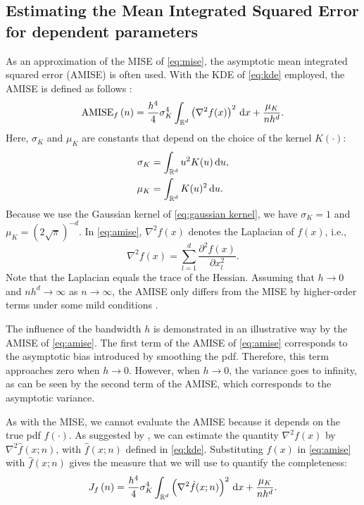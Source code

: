 \subsection{Estimating the Mean Integrated Squared Error for dependent parameters}
\label{sec:mise dependent}

As an approximation of the MISE of \cref{eq:mise}, the asymptotic mean integrated squared error (AMISE) is often used. With the KDE of \cref{eq:kde} employed, the AMISE is defined as follows \cite{marron1992exact}:
\begin{equation}
	\label{eq:amise}
	\textup{AMISE}_{f} \left( n \right) = \frac{h^4}{4} \sigma_K^4 \int_{\mathbb{R}^d} \left( \nabla^2 f(x) \right)^2 \mathrm{\,d} x + \frac{\mu_K}{nh^d}.
\end{equation}
Here, $\sigma_K$ and $\mu_K$ are constants that depend on the choice of the kernel $K(\cdot)$:
\begin{align}
	\sigma_K &= \int_{\mathbb{R}^d} u^2 K(u) \mathrm{\,d} u, \\
	\mu_K &= \int_{\mathbb{R}^d} K(u)^2 \mathrm{\,d} u.
\end{align}
Because we use the Gaussian kernel of \cref{eq:gaussian kernel}, we have $\sigma_K=1$ and $\mu_K=(2\sqrt{\pi})^{-d}$. In \cref{eq:amise}, $\nabla^2 f(x)$ denotes the Laplacian of $f(x)$, i.e., 
\begin{equation}
	\nabla^2 f(x) = \sum_{l=1}^d \frac{\partial^2 f(x)}{\partial x_l^2}.
\end{equation}
Note that the Laplacian equals the trace of the Hessian. Assuming that $h \rightarrow 0$ and $nh^d \rightarrow \infty$ as $n \rightarrow \infty$, the AMISE only differs from the MISE by higher-order terms \cstart under some mild conditions \cend \cite{silverman1986density}.

The influence of the bandwidth $h$ is demonstrated in an illustrative way by the AMISE of \cref{eq:amise}. The first term of the AMISE of \cref{eq:amise} corresponds to the asymptotic bias introduced by smoothing the pdf. Therefore, this term approaches zero when $h \rightarrow 0$. However, when $h \rightarrow 0$, the variance goes to infinity, as can be seen by the second term of the AMISE, which corresponds to the asymptotic variance. 

As with the MISE, we cannot evaluate the AMISE because it depends on the true pdf $f(\cdot)$. As suggested by \textcite{chen2017tutorial, calonico2018effect}, we can estimate the quantity $\nabla^2 f(x)$ by $\nabla^2 \hat{f}(x;n)$, with $\hat{f}(x;n)$ defined in \cref{eq:kde}. 
Substituting $f(x)$ in \cref{eq:amise} with $\hat{f}(x;n)$ gives the measure that we will use to quantify the completeness:
\begin{equation}
	\label{eq:measure}
	J_{f} \left( n \right) = \frac{h^4}{4} \sigma_K^4 \int_{\mathbb{R}^d} \left( \nabla^2 \hat{f}(x;n) \right)^2 \mathrm{\,d} x + \frac{\mu_K}{nh^d}.
\end{equation}

